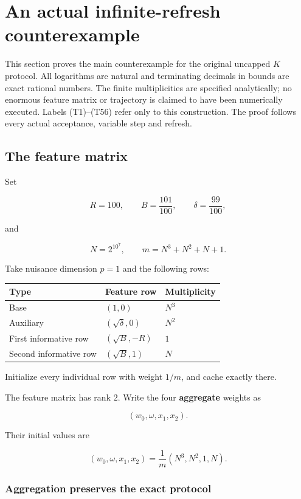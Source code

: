 \section{An actual infinite-refresh counterexample}\label{app:trap}
This section proves the main counterexample for the original uncapped $K$ protocol. All logarithms are natural and terminating decimals in bounds are exact rational numbers. The finite multiplicities are specified analytically; no enormous feature matrix or trajectory is claimed to have been numerically executed. Labels (T1)--(T56) refer only to this construction. The proof follows every actual acceptance, variable step and refresh.
\subsection{The feature matrix}

Set

\[
R=100,\qquad B=\frac{101}{100},\qquad \delta=\frac{99}{100},
\]

and

\[
N=2^{10^7},\qquad m=N^3+N^2+N+1.
\]

Take nuisance dimension \(p=1\) and the following rows:

\begin{center}
\begin{tabular}{lll}\toprule
Type & Feature row & Multiplicity \\ \midrule
Base & \((1,0)\) & \(N^3\) \\
Auxiliary & \((\sqrt{\delta},0)\) & \(N^2\) \\
First informative row & \((\sqrt B,-R)\) & \(1\) \\
Second informative row & \((\sqrt B,1)\) & \(N\) \\
\bottomrule\end{tabular}
\end{center}

Initialize every individual row with weight \(1/m\), and cache exactly there.

The feature matrix has rank \(2\). Write the four \textbf{aggregate} weights as

\[
(w_0,\omega,x_1,x_2).
\]

Their initial values are

\[
(w_0,\omega,x_1,x_2)
=\frac1m(N^3,N^2,1,N).
\tag{T1}
\]

\subsubsection{Aggregation preserves the exact protocol}


